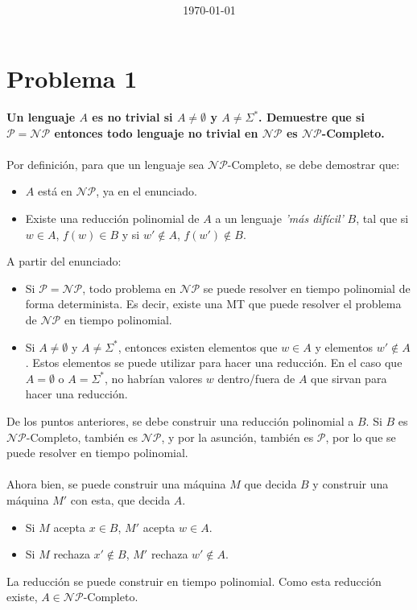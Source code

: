 \documentclass{article}
\title{\task \\ {\normalsize \class \\ \institution \\}}
\author{\me}
\date{\today}
\def\P{\mathcal{P}}
\def\NP{\mathcal{NP}}
\begin{document}
\maketitle
\newpage
\tableofcontents
\newpage

\section{Problema 1}
\textbf{Un lenguaje $A$ es no trivial si $A\neq\emptyset$ y $A\neq\Sigma^{*}$. Demuestre que si $\P = \NP$ entonces todo lenguaje no trivial en $\NP$ es $\NP$-Completo.}
\\\\
Por definición, para que un lenguaje sea $\NP$-Completo, se debe demostrar que:
\begin{itemize}
	\item $A$ está en $\NP$, ya en el enunciado.
	\item Existe una reducción polinomial de $A$ a un lenguaje \textit{'más difícil'} $B$, tal que si $w \in A$, $f(w) \in B$ y si $w' \notin A$, $f(w') \notin B$.
\end{itemize}

A partir del enunciado: 
\begin{itemize}
	\item Si $\P=\NP$, todo problema en $\NP$ se puede resolver en tiempo polinomial de forma determinista. Es decir, existe una MT que puede resolver el problema de $\NP$ en tiempo polinomial. 
	\item Si $A\neq\emptyset$ y $A\neq\Sigma^{*}$, entonces existen elementos que $w \in A$ y elementos $w' \notin A$. Estos elementos se puede utilizar para hacer una reducción. En el caso que $A=\emptyset$ o $A=\Sigma^*$, no habrían valores $w$ dentro/fuera de $A$ que sirvan para hacer una reducción.
\end{itemize}

De los puntos anteriores, se debe construir una reducción polinomial a $B$. Si $B$ es $\NP$-Completo, también es $\NP$, y por la asunción, también es $\P$, por lo que se puede resolver en tiempo polinomial.
\\\\
Ahora bien, se puede construir una máquina $M$ que decida $B$ y construir una máquina $M'$ con esta, que decida $A$. 
\begin{itemize}
	\item Si $M$ acepta $x \in B$, $M'$ acepta $w \in A$. 
	\item Si $M$ rechaza $x' \notin B$, $M'$ rechaza $w' \notin A$. 
\end{itemize}
La reducción se puede construir en tiempo polinomial. Como esta reducción existe, $A\in\NP$-Completo.
\end{document}
